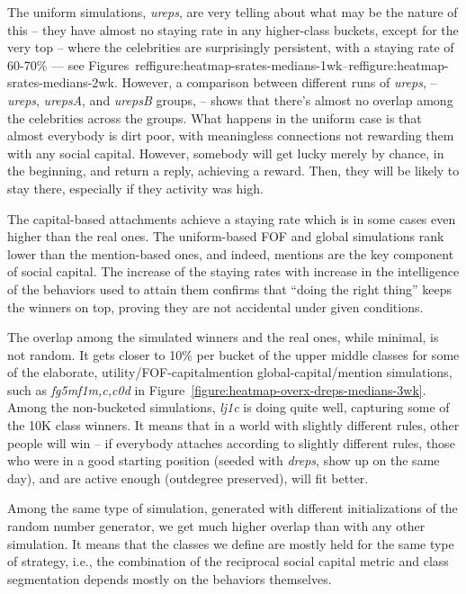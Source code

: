 \documentclass[10pt,oneside]{memoir}
\begin{document}
\begin{Spacing}{2}
The uniform simulations, {\itshape ureps}, are very telling about what may be the nature of this -- they have almost no staying rate in any higher-class buckets, except for the very top -- where the celebrities are surprisingly persistent, with a staying rate of 60-70\% --- see  Figures~ref{figure:heatmap-srates-medians-1wk}--ref{figure:heatmap-srates-medians-2wk}.   However, a comparison between different runs of {\itshape ureps}, -- {\itshape ureps}, {\itshape urepsA}, and {\itshape urepsB} groups, -- shows that there's almost no overlap among the celebrities across the groups.  What happens in the uniform case is that almost everybody is dirt poor, with meaningless connections not rewarding them with any social capital.  However, somebody will get lucky merely by chance, in the beginning, and return a reply, achieving a reward.  Then, they will be likely to stay there, especially if they activity was high.


The capital-based attachments achieve a staying rate which is in some cases even higher than the real ones.  The uniform-based FOF and global simulations rank lower than the mention-based ones, and indeed, mentions are the key component of social capital.  The increase of the staying rates with increase in the intelligence of the behaviors used to attain them confirms that ``doing the right thing'' keeps the winners on top, proving they are not accidental under given conditions.


The overlap among the simulated winners and the real ones, while minimal, is not random.  It gets closer to 10\% per bucket of the upper middle classes for some of the elaborate, utility/FOF-capitalmention global-capital/mention simulations, such as {\itshape fg5mf1{m,c,c0d}} in Figure~\ref{figure:heatmap-overx-dreps-medians-3wk}.  Among the non-bucketed simulations, {\itshape lj1c} is doing quite well, capturing some of the 10K class winners.   It means that in a world with slightly different rules, other people will win -- if everybody attaches according to slightly different rules, those who were in a good starting position (seeded with {\itshape dreps}, show up on the same day), and are active enough (outdegree preserved), will fit better.


Among the same type of simulation, generated with different initializations of the random number generator, we get much higher overlap than with any other simulation.  It means that the classes we define are mostly held for the same type of strategy, i.e., the combination of the reciprocal social capital metric and class segmentation depends mostly on the behaviors themselves.



\end{Spacing}
\end{document}
